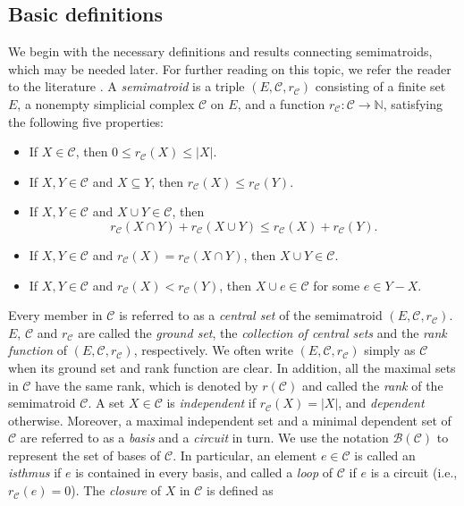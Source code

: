 \documentclass[12pt]{article}%
\numberwithin{equation}{section}
\begin{document}
\subsection{Basic definitions}\label{Sec-2-0}
We begin with the necessary definitions and results connecting semimatroids, which may be needed later. For further reading on this topic, we refer the reader to the literature \cite{Ardila2007}. A {\em semimatroid} is a triple $(E,\mathcal{C},r_{\mathcal{C}})$ consisting of a finite set $E$, a nonempty simplicial complex $\mathcal{C}$ on $E$, and a function $r_\mathcal{C}:\mathcal{C}\to\mathbb{N}$, satisfying the following five properties:
\begin{itemize}[leftmargin=1.4cm]
\item[{\rm (SR1)}] If $X\in\mathcal{C}$, then $0\le r_{\mathcal{C}}(X)\le|X|$.
\item[{\rm (SR2)}] If $X,Y\in\mathcal{C}$ and $X\subseteq Y$, then $r_{\mathcal{C}}(X)\le r_{\mathcal{C}}(Y)$.
\item[{\rm (SR3)}] If $X,Y\in\mathcal{C}$ and $X\cup Y\in\mathcal{C}$, then 
\[
r_{\mathcal{C}}(X\cap Y)+r_{\mathcal{C}}(X\cup Y)\le r_{\mathcal{C}}(X)+r_{\mathcal{C}}(Y).
\]
\item[{\rm (SR4)}] If $X,Y\in\mathcal{C}$ and $r_{\mathcal{C}}(X)=r_{\mathcal{C}}(X\cap Y)$, then $X\cup Y\in\mathcal{C}$.
\item[{\rm (SR5)}] If $X,Y\in\mathcal{C}$ and $r_{\mathcal{C}}(X)<r_{\mathcal{C}}(Y)$, then $X\cup e\in\mathcal{C}$ for some $e\in Y-X$.
\end{itemize}
Every member in $\mathcal{C}$ is referred to as a {\em central set} of the semimatroid $(E,\mathcal{C},r_{\mathcal{C}})$. $E$, $\mathcal{C}$ and $r_{\mathcal{C}}$ are called the {\em ground set}, the {\em collection of central sets} and the {\em rank function} of $(E,\mathcal{C},r_{\mathcal{C}})$, respectively. We often write $(E,\mathcal{C},r_{\mathcal{C}})$ simply as $\mathcal{C}$ when its ground set and rank function are clear. In addition, all the maximal sets in $\mathcal{C}$ have the same rank, which is denoted by $r(\mathcal{C})$ and called the {\em rank}  of the semimatroid $\mathcal{C}$. A set $X\in\mathcal{C}$ is {\em independent} if $r_{\mathcal{C}}(X)=|X|$, and {\em dependent} otherwise. Moreover, a maximal independent set and a minimal dependent set of $\mathcal{C}$ are  referred to as a {\em basis} and a {\em circuit} in turn. We use the notation $\mathscr{B}(\mathcal{C})$ to represent the set of bases of $\mathcal{C}$. In particular, an element $e\in\mathcal{C}$ is called an {\em isthmus} if $e$ is contained in every basis, and called a {\em loop} of $\mathcal{C}$ if $e$ is a circuit (i.e., $r_\mathcal{C}(e)=0$). The {\em closure} of $X$ in $\mathcal{C}$ is defined as
\end{document}

